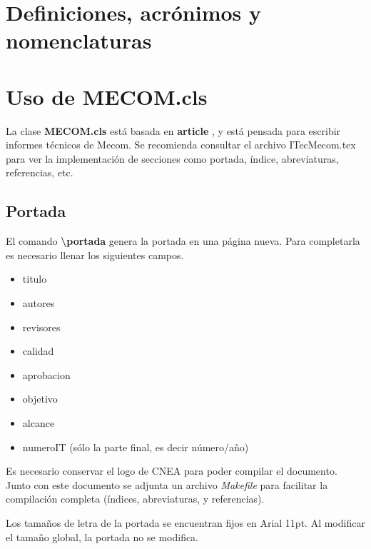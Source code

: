 \documentclass[a4paper,11pt,twoside]{MECOM}
\begin{document}
    \portada
    
    \tableofcontents   
    
    \section{Definiciones, acr\'onimos y nomenclaturas}
        \printnomenclature[2cm]
        
    \section{Uso de MECOM.cls}
    La clase {\bf MECOM.cls} est\'a basada en {\bf article} \cite{hefferon_minutes_2005}, y est\'a pensada para escribir informes t\'ecnicos de Mecom. Se recomienda consultar el archivo ITec\textunderscore Mecom.tex para ver la implementaci\'on de secciones como portada, \'indice, abreviaturas, referencias, etc.
    
    \subsection{Portada}
        El comando {\bf \textbackslash portada} genera la portada en una p\'agina nueva. Para completarla es necesario llenar los siguientes campos.
        \begin{itemize}
            \item titulo
            \item autores
            \item revisores
            \item calidad
            \item aprobacion
            \item objetivo
            \item alcance
            \item numeroIT (s\'olo la parte final, es decir n\'umero/a\~no)
        \end{itemize}
        \par
        Es necesario conservar el logo de CNEA para poder compilar el documento. Junto con este documento se adjunta un archivo \emph{Makefile} para facilitar la compilaci\'on completa (\'indices, abreviaturas, y referencias).
        \par
        Los tama\~nos de letra de la portada se encuentran fijos en Arial 11pt. Al modificar el tama\~no global, la portada no se modifica.
        
\end{document}
